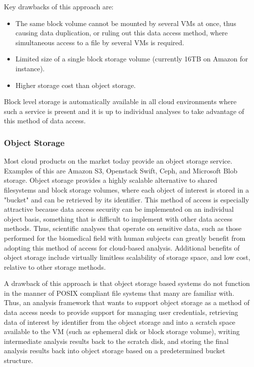 Key drawbacks of this approach are:

\begin{itemize}
\item The same block volume cannot be mounted by several VMs at once, thus causing data duplication, or ruling out this data access method, where simultaneous access to a file by several VMs is required.
\item Limited size of a single block storage volume (currently 16TB on Amazon for instance).
\item Higher storage cost than object storage.
\end{itemize}

Block level storage is automatically available in all cloud environments where such a service is present and it is up to individual analyses to take advantage of this method of data access. 

\subsubsection{Object Storage}

Most cloud products on the market today provide an object storage service. Examples of this are Amazon S3, Openstack Swift, Ceph\autocite{weil2006ceph}, and Microsoft Blob storage.  Object storage provides a highly scalable alternative to shared filesystems and block storage volumes, where each object of interest is stored in a "bucket" and can be retrieved by its identifier.  This method of access is especially attractive because data access security can be implemented on an individual object basis, something that is difficult to implement with other data access methods. Thus, scientific analyses that operate on sensitive data, such as those performed for the biomedical field with human subjects can greatly benefit from adopting this method of access for cloud-based analysis. Additional benefits of object storage include virtually limitless scalability of storage space, and low cost, relative to other storage methods.  

A drawback of this approach is that object storage based systems do not function in the manner of POSIX compliant file systems that many are familiar with. Thus, an analysis framework that wants to support object storage as a method of data access needs to provide support for managing user credentials, retrieving data of interest by identifier from the object storage and into a scratch space available to the VM (such as ephemeral disk or block storage volume), writing intermediate analysis results back to the scratch disk, and storing the final analysis results back into object storage based on a predetermined bucket structure.

